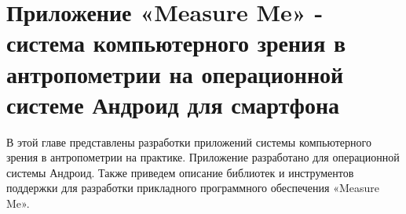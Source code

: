 \chapter{Приложение «Measure Me» - система компьютерного зрения в антропометрии на операционной системе Андроид для смартфона} \label{chapt3}
В этой главе представлены разработки приложений системы компьютерного зрения в антропометрии на практике. Приложение разработано для операционной системы Андроид. Также приведем описание библиотек и инструментов поддержки для разработки прикладного программного обеспечения «Measure Me».



